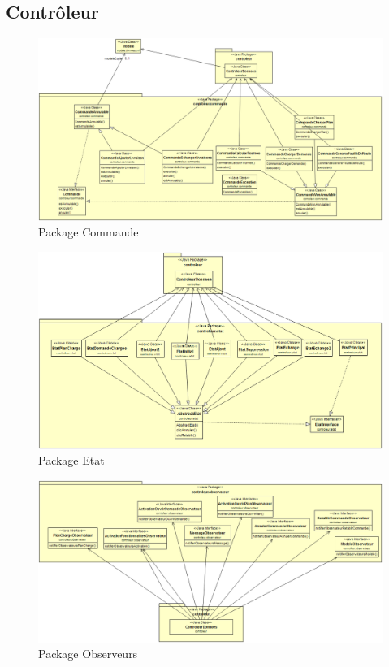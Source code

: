 \documentclass[10pt,a4paper]{book}
\begin{document}
\subsection{Contrôleur}
\begin{figure}[h!]
    \centering
    \includegraphics[scale=0.38]{DcCommande.png}
    \caption{Package Commande}
\end{figure}
\newpage
\begin{figure}[h!]
    \centering
    \includegraphics[scale=0.4]{DcEtat.png}
    \caption{Package Etat}
\end{figure}
\begin{figure}[h!]
    \centering
    \includegraphics[scale=0.4]{DcObservateur.png}
    \caption{Package Observeurs}
\end{figure}
\end{document}
